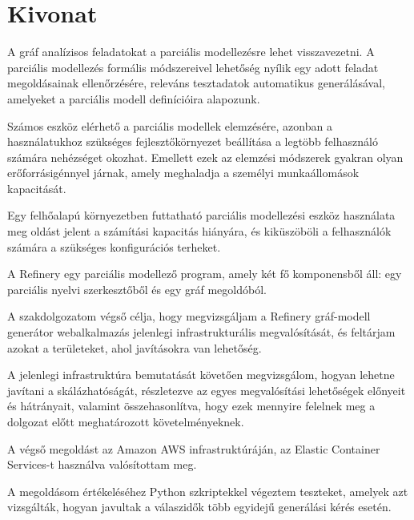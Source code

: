 \setcounter{page}{1}

\selecthungarian

\chapter*{Kivonat}
	A gráf analízisos feladatokat a parciális modellezésre lehet visszavezetni. 
	A parciális modellezés formális módszereivel lehetőség nyílik egy adott feladat megoldásainak ellenőrzésére, releváns tesztadatok automatikus generálásával, amelyeket a parciális modell definícióira alapozunk.

	Számos eszköz elérhető a parciális modellek elemzésére, azonban a használatukhoz szükséges fejlesztőkörnyezet beállítása a legtöbb felhasználó számára nehézséget okozhat. Emellett ezek az elemzési módszerek gyakran olyan erőforrásigénnyel járnak, amely meghaladja a személyi munkaállomások kapacitását.	

	Egy felhőalapú környezetben futtatható parciális modellezési eszköz használata meg
	oldást jelent a számítási kapacitás hiányára, és kiküszöböli a felhasználók számára a
 	szükséges konfigurációs terheket.

	A Refinery egy parciális modellező program, amely két fő komponensből áll: egy parciális
	nyelvi szerkesztőből és egy gráf megoldóból.

	A szakdolgozatom végső célja, hogy megvizsgáljam a Refinery gráf-modell generátor webalkalmazás jelenlegi infrastrukturális megvalósítását, 
	és feltárjam azokat a területeket, ahol javításokra van lehetőség.

	A jelenlegi infrastruktúra bemutatását követően megvizsgálom, hogyan lehetne javítani a skálázhatóságát,
	 részletezve az egyes megvalósítási lehetőségek előnyeit és hátrányait, 
	 valamint összehasonlítva, hogy ezek mennyire felelnek meg a dolgozat előtt meghatározott követelményeknek.

	A végső megoldást az Amazon AWS infrastruktúráján, az Elastic Container Services-t használva 
	valósítottam meg.

	A megoldásom értékeléséhez Python szkriptekkel végeztem teszteket, 
	amelyek azt vizsgálták, hogyan javultak a válaszidők több egyidejű generálási kérés esetén.


\vfill
\selectenglish


